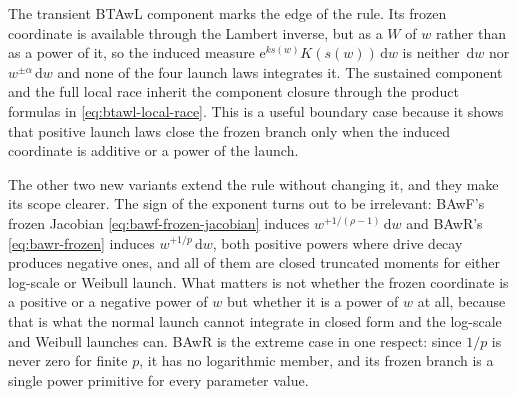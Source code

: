 \documentclass[12pt]{article}
\newcommand{\dd}{\,\mathrm{d}}
\newcommand{\e}{\mathrm{e}}
\theoremstyle{remark}
\begin{document}
The transient BTAwL component marks the edge of the rule. Its frozen coordinate is available through the Lambert inverse, but as a $W$ of $w$ rather than as a power of it, so the induced measure $\e^{ks(w)}K(s(w))\dd w$ is neither $\dd w$ nor $w^{\pm\alpha}\dd w$ and none of the four launch laws integrates it.  The sustained component and the full local race inherit the component closure through the product formulas in
\eqref{eq:btawl-local-race}.  This is a useful boundary case because it shows
that positive launch laws close the frozen branch only when the induced coordinate is additive or a power of the launch.

The other two new variants extend the rule without changing it, and they make its scope clearer. The sign of the exponent turns out to be irrelevant: BAwF's frozen Jacobian \eqref{eq:bawf-frozen-jacobian} induces $w^{+1/(\rho-1)}\dd w$ and BAwR's \eqref{eq:bawr-frozen} induces $w^{+1/p}\dd w$, both positive powers where drive decay produces negative ones, and all of them are closed truncated moments for either log-scale or Weibull launch. What matters is not whether the frozen coordinate is a positive or a negative power of $w$ but whether it is a power of $w$ at all, because that is what the normal launch cannot integrate in closed form and the log-scale and Weibull launches can. BAwR is the extreme case in one respect: since $1/p$ is never zero for finite $p$, it has no logarithmic member, and its frozen branch is a single power primitive for every parameter value.

\end{document}
